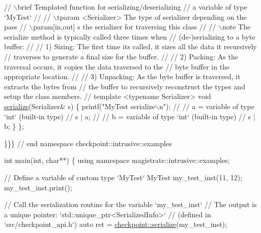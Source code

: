 \begin{DoxyCodeInclude}
{  \textcolor{comment}{// \(\backslash\)brief Templated function for serializing/deserializing}
  \textcolor{comment}{// a variable of type `MyTest`}
  \textcolor{comment}{//}
  \textcolor{comment}{// \(\backslash\)tparam <Serializer> The type of serializer depending on the pass}
  \textcolor{comment}{// \(\backslash\)param[in,out] s the serializer for traversing this class}
  \textcolor{comment}{//}
  \textcolor{comment}{// \(\backslash\)note The serialize method is typically called three times when}
  \textcolor{comment}{// (de-)serializing to a byte buffer:}
  \textcolor{comment}{//}
  \textcolor{comment}{// 1) Sizing: The first time its called, it sizes all the data it recursively}
  \textcolor{comment}{// traverses to generate a final size for the buffer.}
  \textcolor{comment}{//}
  \textcolor{comment}{// 2) Packing: As the traversal occurs, it copies the data traversed to the}
  \textcolor{comment}{// byte buffer in the appropriate location.}
  \textcolor{comment}{//}
  \textcolor{comment}{// 3) Unpacking: As the byte buffer is traversed, it extracts the bytes from}
  \textcolor{comment}{// the buffer to recursively reconstruct the types and setup the class members.}
  \textcolor{comment}{//}
  \textcolor{keyword}{template} <\textcolor{keyword}{typename} Serializer>
  \textcolor{keywordtype}{void} \hyperlink{namespacecheckpoint_a075da4e7344cf037943362517e606c3a}{serialize}(Serializer& s) \{
    printf(\textcolor{stringliteral}{"MyTest serialize\(\backslash\)n"});
    \textcolor{comment}{//}
    \textcolor{comment}{// a = variable of type `int` (built-in type)}
    \textcolor{comment}{//}
    s | a;
    \textcolor{comment}{//}
    \textcolor{comment}{// b = variable of type `int` (built-in type)}
    \textcolor{comment}{//}
    s | b;
  \}
\};

\}\}\} \textcolor{comment}{// end namespace checkpoint::intrusive::examples}

\textcolor{keywordtype}{int} main(\textcolor{keywordtype}{int}, \textcolor{keywordtype}{char}**) \{
  \textcolor{keyword}{using namespace }magistrate::intrusive::examples;

  \textcolor{comment}{// Define a variable of custom type `MyTest`}
  MyTest my\_test\_inst(11, 12);
  my\_test\_inst.print();

  \textcolor{comment}{// Call the serialization routine for the variable `my\_test\_inst`}
  \textcolor{comment}{// The output is a unique pointer: `std::unique\_ptr<SerializedInfo>`}
  \textcolor{comment}{// (defined in `src/checkpoint\_api.h`)}
  \textcolor{keyword}{auto} ret = \hyperlink{namespacecheckpoint_a075da4e7344cf037943362517e606c3a}{checkpoint::serialize}(my\_test\_inst);

}
\end{DoxyCodeInclude}
